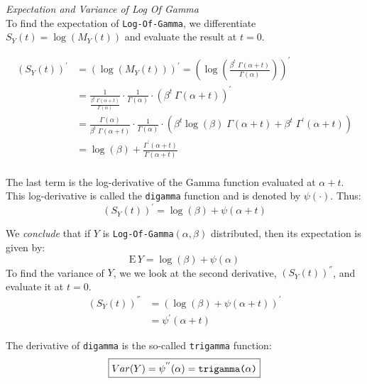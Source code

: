 \documentclass[12pt]{article}
\begin{document}
\bigskip 
\bigskip 

{\color{TealBlue}\emph{Expectation and Variance of Log Of Gamma} }\\

To find the expectation of \texttt{Log-Of-Gamma}, we differentiate $S_Y(t) = \log (M_Y(t))$ and evaluate the result at $t = 0$.

\begin{align*}
(S_Y(t))^{'} &= (\log (M_Y(t)))^{'} = \left(\log \left(\frac{\beta^t \; \Gamma(\alpha + t)}{\Gamma(\alpha)} \right)\right)^{'} \\
&= \frac{1}{\frac{\beta^t \; \Gamma(\alpha + t)} {\Gamma(\alpha)}} \cdot \frac{1}{\Gamma(\alpha)} \cdot \left(  \beta^t \: \Gamma(\alpha + t)  \right)^{'}\\
&= \frac{\Gamma(\alpha)}{\beta^t \; \Gamma(\alpha + t)}  \cdot \frac{1}{\Gamma(\alpha)} \cdot \left(  \beta^t \log(\beta) \; \Gamma(\alpha + t) + \beta^t \; \Gamma^{'} (\alpha +t) \right)\\
&= \log(\beta) + \frac{\Gamma^{'} (\alpha +t) }{\Gamma(\alpha + t)}\\
\end{align*}


The last term is the log-derivative of the Gamma function evaluated at $\alpha + t$. This log-derivative is called the \texttt{digamma} function and is denoted by $\psi(\cdot)$. Thus:
$$
\boxed{(S_Y(t))^{'} =  \log(\beta) +\psi(\alpha +t)}
$$

We \emph{conclude} that if $Y$ is \texttt{Log-Of-Gamma}$(\alpha, \beta)$ distributed, then its expectation is given by:
$$
 \boxed{\mathrm{E}\, Y =  \log(\beta) +\psi(\alpha)}
$$
To find the variance of $Y$, we we look at the second derivative, $(S_Y(t))^{''}$, and evaluate it at $t=0$.
\begin{align*}
(S_Y(t))^{''} &= (\log(\beta) +\psi(\alpha +t))^{'}\\
&= \psi^{'}(\alpha +t)
\end{align*}

The derivative of \texttt{digamma} is the so-called \texttt{trigamma} function:
$$
\boxed{Var(Y) = \psi^{''}(\alpha) = \text{\texttt{trigamma($\alpha$)}}}
$$
\end{document}
